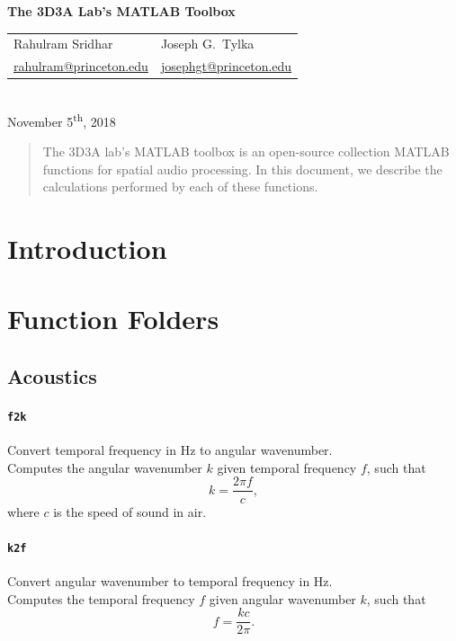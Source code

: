 \documentclass[11pt, oneside]{article}
\newcommand{\function}[1]{\paragraph*{\texttt{#1}}}
\begin{document}
\begin{centering}
{\Large \textbf{The 3D3A Lab's MATLAB Toolbox}}\\
\vspace{\baselineskip}
\begin{tabular}{CC}
    Rahulram Sridhar & Joseph G.~Tylka \\
    \href{mailto:rahulram@princeton.edu}{rahulram@princeton.edu} & \href{mailto:josephgt@princeton.edu}{josephgt@princeton.edu}
\end{tabular}\\
\vspace{\baselineskip}
November 5\textsuperscript{th}, 2018\\
\end{centering}

\begin{abstract}
The 3D3A lab's MATLAB toolbox is an open-source collection MATLAB functions for spatial audio processing.
In this document, we describe the calculations performed by each of these functions.
\end{abstract}

\section{Introduction}


\section{Function Folders}

\subsection{Acoustics}

\function{f2k} Convert temporal frequency in Hz to angular wavenumber. \\
Computes the angular wavenumber $k$ given temporal frequency $f$, such that
\begin{equation}
k = \frac{2 \pi f}{c},
\end{equation}
where $c$ is the speed of sound in air.

\function{k2f} Convert angular wavenumber to temporal frequency in Hz. \\
Computes the temporal frequency $f$ given angular wavenumber $k$, such that
\begin{equation}
f = \frac{k c}{2 \pi}.
\end{equation}
\end{document}
